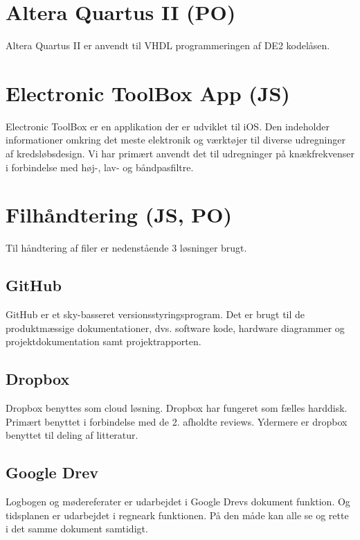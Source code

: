 \section{Altera Quartus II (PO)}
Altera Quartus II er anvendt til VHDL programmeringen af DE2 kodelåsen.

\section{Electronic ToolBox App (JS)}
Electronic ToolBox er en applikation der er udviklet til iOS. Den indeholder informationer omkring det meste elektronik og værktøjer til diverse udregninger af kredsløbsdesign. Vi har primært anvendt det til udregninger på knækfrekvenser i forbindelse med høj-, lav- og båndpasfiltre.  

\section{Filhåndtering (JS, PO)}
Til håndtering af filer er nedenstående 3 løsninger brugt. 

\subsection{GitHub}
GitHub er et sky-basseret versionsstyringsprogram. Det er brugt til de produktmæssige dokumentationer, dvs. software kode, hardware diagrammer og projektdokumentation samt projektrapporten.

\subsection{Dropbox}
Dropbox benyttes som cloud løsning. Dropbox har fungeret som fælles harddisk. Primært benyttet i forbindelse med de 2. afholdte reviews. Ydermere er dropbox benyttet til deling af litteratur. 

\subsection{Google Drev}
Logbogen og mødereferater er udarbejdet i Google Drevs dokument funktion. Og tidsplanen er udarbejdet i regneark funktionen. På den måde kan alle se og rette i det samme dokument samtidigt. 



